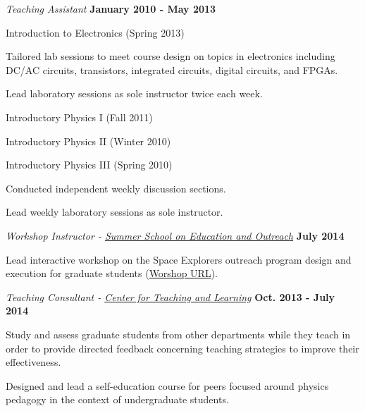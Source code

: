 \documentclass[10pt]{article}
\newenvironment{outerlist}[1][\enskip\textbullet]%
        {\begin{itemize}[#1]}{\end{itemize}%
         \vspace{-.6\baselineskip}}
\newenvironment{innerlist}[1][\enskip\textbullet]%
        {\begin{compactitem}[#1]}{\end{compactitem}}
\begin{document}
\begin{outerlist}
\item[] \textit{Teaching Assistant}%
    \hfill \textbf{January 2010 - May 2013}
    \begin{innerlist}
        \item Introduction to Electronics (Spring 2013)
        \begin{innerlist}
            \item Tailored lab sessions to meet course design on topics in electronics including DC/AC circuits, transistors, integrated circuits, digital circuits, and FPGAs.
            \item Lead laboratory sessions as sole instructor twice each week.
        \end{innerlist}
        \item Introductory Physics I (Fall 2011)
        \item Introductory Physics II (Winter 2010)
        \item Introductory Physics III (Spring 2010)
        \begin{innerlist}
            \item Conducted independent weekly discussion sections.
            \item Lead weekly laboratory sessions as sole instructor.
        \end{innerlist}
    \end{innerlist}
    
\item[] \textit{Workshop Instructor - \href{http://kicp.uchicago.edu/events/kicp_workshops-2014.html\#id\_429}{Summer School on Education and Outreach}} %
    \hfill \textbf{July 2014}
    \begin{innerlist}
        \item Lead interactive workshop on the Space Explorers outreach program design and execution for graduate students (\href{http://kicp.uchicago.edu/events/kicp_workshops-2014.html#id_429}{Worshop URL}).
        \end{innerlist}

\item[] \textit{Teaching Consultant - \href{http://teaching.uchicago.edu/?/graduate-instructors/the-teaching-consultant-program.html}{Center for Teaching and Learning}}%
    \hfill \textbf{Oct. 2013 - July 2014}
    \begin{innerlist}
        \item Study and assess graduate students from other departments while they teach in order to provide directed feedback concerning teaching strategies to improve their effectiveness.
        \item Designed and lead a self-education course for peers focused around physics pedagogy in the context of undergraduate students. 
    \end{innerlist}
    
\end{outerlist}
\end{document}
